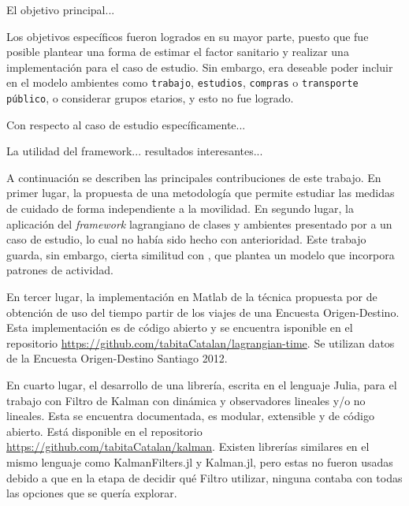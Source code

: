 \begin{conclusion} \label{chap:conclu}


El objetivo principal... 

Los objetivos específicos fueron logrados en su mayor parte, puesto que fue posible plantear una forma de estimar el factor sanitario y realizar una implementación para el caso de estudio. Sin embargo, era deseable poder incluir en el modelo ambientes como \texttt{trabajo}, \texttt{estudios}, \texttt{compras} o \texttt{transporte público}, o considerar grupos etarios, y esto no fue logrado. 

Con respecto al caso de estudio específicamente...

La utilidad del framework... resultados interesantes...

A continuación se describen las principales contribuciones de este trabajo. En primer lugar, la propuesta de una metodología que permite estudiar las medidas de cuidado de forma independiente a la movilidad. En segundo lugar, la aplicación del \textit{framework} lagrangiano de clases y ambientes presentado por \cite{Bichara2018} a un caso de estudio, lo cual no había sido hecho con anterioridad. Este trabajo guarda, sin embargo, cierta similitud con \cite{Shikhmurzaev}, que plantea un modelo que incorpora patrones de actividad.

En tercer lugar, la implementación en Matlab de la técnica propuesta por \cite{Munizaga2011} de obtención de uso del tiempo partir de los viajes de una Encuesta Origen-Destino. Esta implementación es de código abierto y se encuentra isponible en el repositorio \url{https://github.com/tabitaCatalan/lagrangian-time}. Se utilizan datos de la Encuesta Origen-Destino Santiago 2012.

En cuarto lugar, el desarrollo de una librería, escrita en el lenguaje Julia, para el trabajo con Filtro de Kalman con dinámica y observadores lineales y/o no lineales. Esta se encuentra documentada, es modular, extensible y de código abierto. Está disponible en el repositorio \url{https://github.com/tabitaCatalan/kalman}. Existen librerías similares en el mismo lenguaje como KalmanFilters.jl y Kalman.jl, pero estas no fueron usadas debido a que en la etapa de decidir qué Filtro utilizar, ninguna contaba con todas las opciones que se quería explorar. 


\end{conclusion}
